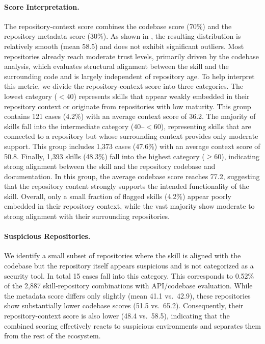 \paragraph{Score Interpretation.}
The repository-context score combines the codebase score (70\%) and the repository metadata score (30\%). As shown in , the resulting distribution is relatively
smooth (mean 58.5) and does not exhibit significant outliers. Most repositories already reach moderate trust levels, primarily driven by the codebase analysis, which evaluates structural
alignment between the skill and the surrounding code and is largely independent of repository age. To help interpret this metric, we divide the repository-context score into three
categories. The lowest category ($<40$) represents skills that appear weakly embedded in their repository context or originate from repositories with low maturity. This group contains 121
cases (4.2\%) with an average context score of 36.2.
The majority of skills fall into the intermediate category ($40$–$<60$), representing skills that are connected to a repository but whose surrounding context provides only moderate
support. This group includes 1,373 cases (47.6\%) with an average context score of 50.8.
Finally, 1,393 skills (48.3\%) fall into the highest category ($\geq60$), indicating strong alignment between the skill and the repository codebase and documentation. In this group, the
average codebase score reaches 77.2, suggesting that the repository content strongly supports the intended functionality of the skill.
Overall, only a small fraction of flagged skills (4.2\%) appear poorly embedded in their repository context, while the vast majority show moderate to strong alignment with their
surrounding repositories.


\paragraph{Suspicious Repositories.}
We identify a small subset of repositories where the skill is aligned with the codebase but the repository itself appears suspicious and is not categorized as a security tool. In total 15 cases fall into this category. This corresponds to 0.52\% of the 2,887 skill-repository combinations with API/codebase evaluation. While the metadata score differs only slightly (mean 41.1 vs.\ 42.9), these repositories show substantially lower codebase scores (51.5 vs.\ 65.2). Consequently, their repository-context score is also lower (48.4 vs.\ 58.5), indicating that the combined scoring effectively reacts to suspicious environments and separates them from the rest of the ecosystem.

